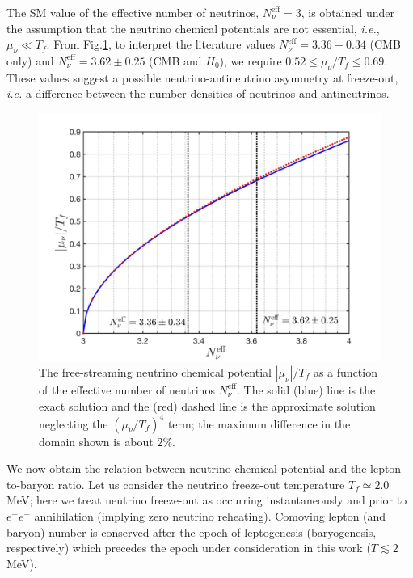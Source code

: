 The SM value of the effective number of neutrinos, $N_\nu^{\mathrm{eff}}=3$, is obtained under the assumption that the neutrino chemical potentials are not essential, {\it i.e.\/}, $\mu_\nu\ll T_f$. From Fig.\;\ref{ChemicalPotentialNeff}, to interpret the literature values $N_\nu^{\mathrm{eff}}=3.36\pm0.34$ (CMB only) and $N_\nu^{\mathrm{eff}}= 3.62\pm0.25$ (CMB and $H_0$), we require $0.52\leqslant\mu_\nu/T_f\leqslant0.69$. These values suggest  a possible neutrino-antineutrino asymmetry at freeze-out, {\it i.e.\/} a difference between the number densities of neutrinos and antineutrinos.

\begin{figure}[t]
\begin{center}
\includegraphics[width=0.9\linewidth]{./plots/Chemical_Potential_Neff}
\caption{The free-streaming neutrino chemical potential $|\mu_\nu|/T_f$ as a function of the effective number of neutrinos $N_\nu^{\mathrm{eff}}$. The solid (blue) line is the exact solution and the (red) dashed line is the approximate solution neglecting the $(\mu_\nu/T_f)^4$ term; the maximum difference in the domain shown is about $2\%$. }
\label{ChemicalPotentialNeff}
\end{center}
\end{figure}



We now obtain the relation between neutrino chemical potential and the lepton-to-baryon ratio. Let us consider the neutrino freeze-out temperature $T_f\simeq 2.0$\,MeV; here we treat neutrino freeze-out as occurring instantaneously and prior to $e^+e^-$ annihilation (implying zero neutrino reheating). Comoving lepton (and baryon) number is conserved after the epoch of leptogenesis (baryogenesis, respectively) which precedes the epoch  under consideration in this work ($T\lesssim 2$\;MeV). 

